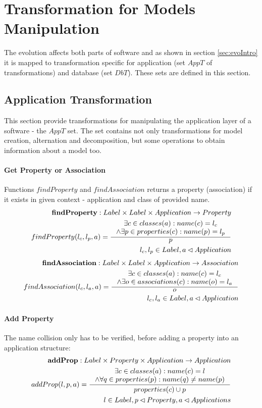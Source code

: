 \documentclass[11pt]{article}
\begin{document}
\section{Transformation for Models Manipulation}
The evolution affects both parts of software and as shown in section \ref{sec:evoIntro} it is mapped to transformation specific for application (set $AppT$ of transformations) and database (set $DbT$). These sets are defined in this section.

\subsection{Application Transformation}
This section provide transformations for manipulating the application layer of a software - the $AppT$ set. The set contains not only transformations for model creation, alternation and decomposition, but some operations to obtain information about a model too.

\paragraph{Get Property or Association} Functions $findProperty$ and $findAssociation$ returns a property (association) if it exists in given context - application and class of provided name.
\begin{align*}
	\mathbf{findProperty} : Label \times Label \times Application \rightarrow Property \\
	findProperty(l_c, l_p, a) = \inference{\exists c \in classes(a): name(c) = l_c \\ \wedge \exists p \in properties(c) : name(p) = l_p}{p} \\
	l_c, l_p \in Label, a \lhd Application
\end{align*}
\begin{align*}
	\mathbf{findAssociation} : Label \times Label \times Application \rightarrow Association \\
	findAssociation(l_c, l_a, a) = \inference{\exists c \in classes(a): name(c) = l_c \\ \wedge \exists o \in associations(c) : name(o) = l_a}{o} \\
	l_c, l_a \in Label, a \lhd Application
\end{align*}

\paragraph{Add Property} The name collision only has to be verified, before adding a property into an application structure:
\begin{align*}
 	\mathbf{addProp} : Label \times Property \times Application \rightarrow Application \\
	addProp(l, p, a) = \inference{\exists c \in classes(a) : name(c) = l \\ \wedge \forall q \in  properties(p) : name(q) \neq name(p)}{properties(c) \cup p } \\
	l \in Label, p \lhd Property, a \lhd Applications
\end{align*}
\end{document}
